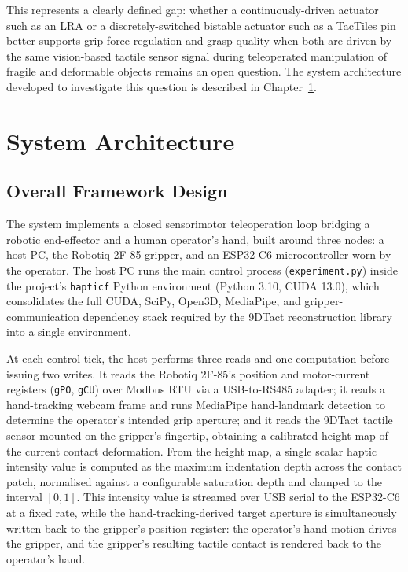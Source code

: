 \documentclass[12pt, a4paper]{report}
\begin{document}
This represents a clearly defined gap: whether a continuously-driven actuator such as an LRA or a discretely-switched bistable actuator such as a TacTiles pin better supports grip-force regulation and grasp quality when both are driven by the same vision-based tactile sensor signal during teleoperated manipulation of fragile and deformable objects remains an open question. The system architecture developed to investigate this question is described in Chapter~\ref{ch:architecture}.

\chapter{System Architecture}
\label{ch:architecture}
\section{Overall Framework Design}
\label{sec:framework}
The system implements a closed sensorimotor teleoperation loop bridging a robotic end-effector and a human operator's hand, built around three nodes: a host PC, the Robotiq 2F-85 gripper, and an ESP32-C6 microcontroller worn by the operator. The host PC runs the main control process (\texttt{experiment.py}) inside the project's \texttt{hapticf} Python environment (Python 3.10, CUDA 13.0), which consolidates the full CUDA, SciPy, Open3D, MediaPipe, and gripper-communication dependency stack required by the 9DTact reconstruction library into a single environment.

At each control tick, the host performs three reads and one computation before issuing two writes. It reads the Robotiq 2F-85's position and motor-current registers (\texttt{gPO}, \texttt{gCU}) over Modbus RTU via a USB-to-RS485 adapter; it reads a hand-tracking webcam frame and runs MediaPipe hand-landmark detection to determine the operator's intended grip aperture; and it reads the 9DTact tactile sensor mounted on the gripper's fingertip, obtaining a calibrated height map of the current contact deformation. From the height map, a single scalar haptic intensity value is computed as the maximum indentation depth across the contact patch, normalised against a configurable saturation depth and clamped to the interval $[0,1]$. This intensity value is streamed over USB serial to the ESP32-C6 at a fixed rate, while the hand-tracking-derived target aperture is simultaneously written back to the gripper's position register: the operator's hand motion drives the gripper, and the gripper's resulting tactile contact is rendered back to the operator's hand.
\end{document}

